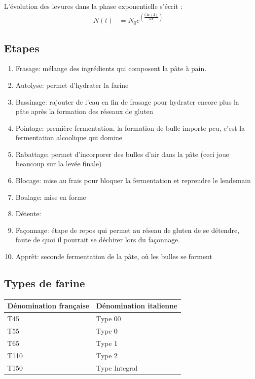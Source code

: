 \documentclass[a4paper,twoside,openright]{report}
\begin{document}
L'évolution des levures dans la phase exponentielle s'écrit :
\begin{align}
N(t) &= N_0 e^{\left(\frac{t\ln(2)}{\mathrm{GT}}\right)}
\end{align}

\subsection{Etapes}

\begin{enumerate}
\item Frasage: mélange des ingrédients qui composent la pâte à pain.
\item Autolyse: permet d'hydrater la farine
\item Bassinage: rajouter de l'eau en fin de frasage pour hydrater encore plus la pâte après la formation des réseaux de gluten
\item Pointage: première fermentation, la formation de bulle importe peu, c'est la fermentation alcoolique qui domine
\item Rabattage: permet d'incorporer des bulles d'air dans la pâte (ceci joue beaucoup sur la levée finale)
\item Blocage: mise au frais pour bloquer la fermentation et reprendre le lendemain
\item Boulage: mise en forme
\item Détente: 
\item Façonnage: étape de repos qui permet au réseau de gluten de se détendre, faute de quoi il pourrait se déchirer lors du façonnage.
\item Apprêt: seconde fermentation de la pâte, où les bulles se forment
\end{enumerate}

\subsection{Types de farine}

\begin{center}
\begin{tabular}{|l|l|}\hline
Dénomination française & Dénomination italienne\\\hline
T45      &  Type 00   \\\hline
T55      &  Type 0       \\\hline
T65      &  Type 1      \\\hline
T110     &  Type 2           \\\hline
T150     &  Type Integral         \\\hline
\end{tabular}
\end{center}
\end{document}
